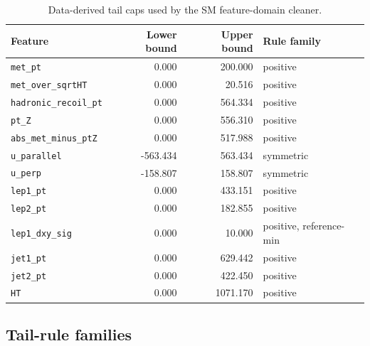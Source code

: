 \documentclass[11pt,a4paper,twocolumn]{article}
\begin{document}
\begin{table}[h]
\centering
\small
\caption{Data-derived tail caps used by the SM feature-domain cleaner.}
\label{tab:appendix-cleaning-caps}
\begin{tabular}{lrrl}
\toprule
Feature & Lower bound & Upper bound & Rule family \\
\midrule
\texttt{met\_pt} & 0.000 & 200.000 & positive \\
\texttt{met\_over\_sqrtHT} & 0.000 & 20.516 & positive \\
\texttt{hadronic\_recoil\_pt} & 0.000 & 564.334 & positive \\
\texttt{pt\_Z} & 0.000 & 556.310 & positive \\
\texttt{abs\_met\_minus\_ptZ} & 0.000 & 517.988 & positive \\
\texttt{u\_parallel} & -563.434 & 563.434 & symmetric \\
\texttt{u\_perp} & -158.807 & 158.807 & symmetric \\
\texttt{lep1\_pt} & 0.000 & 433.151 & positive \\
\texttt{lep2\_pt} & 0.000 & 182.855 & positive \\
\texttt{lep1\_dxy\_sig} & 0.000 & 10.000 & positive, reference-min \\
\texttt{jet1\_pt} & 0.000 & 629.442 & positive \\
\texttt{jet2\_pt} & 0.000 & 422.450 & positive \\
\texttt{HT} & 0.000 & 1071.170 & positive \\
\bottomrule
\end{tabular}

\end{table}

\subsection{Tail-rule families}
\label{app:tail-rule-families}
\end{document}
